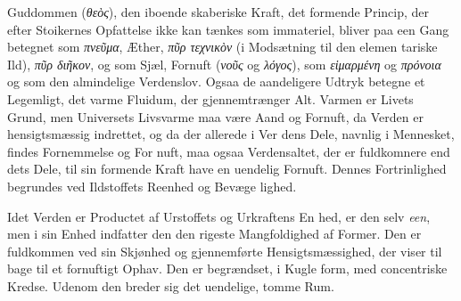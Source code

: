 \documentclass[12pt,a4paper]{book}
\newcommand{\gk}[1]{\textit{#1}}
\begin{document}
Guddommen (\gk{θεὸς}), den iboende skaberiske Kraft, det
formende Princip, der efter Stoikernes Opfattelse ikke kan
tænkes som immateriel, bliver paa een Gang betegnet som
\gk{πνεῦμα}, Æther, \gk{πῦρ τεχνικὸν} (i Modsætning til den elemen\-%
tariske Ild), \gk{πῦρ διῆκον}, og som Sjæl, Fornuft (\gk{νοῦς} og \gk{λόγος}),
som \gk{εἱμαρμένη} og \gk{πρόνοια} og som den almindelige Verdenslov.
Ogsaa de aandeligere Udtryk betegne et Legemligt, det varme
Fluidum, der gjennemtrænger Alt. Varmen er Livets Grund,
men Universets Livsvarme maa være Aand og Fornuft, da
Verden er hensigtsmæssig indrettet, og da der allerede i Ver\-%
dens Dele, navnlig i Mennesket, findes Fornemmelse og For\-%
nuft, maa ogsaa Verdensaltet, der er fuldkomnere end dets
Dele, til sin formende Kraft have en uendelig Fornuft. Dennes
Fortrinlighed begrundes ved Ildstoffets Reenhed og Bevæge\-%
lighed.

Idet Verden er Productet af Urstoffets og Urkraftens En\-%
hed, er den selv \emph{een}, men i sin Enhed indfatter den den
rigeste Mangfoldighed af Former. Den er fuldkommen ved sin
Skjønhed og gjennemførte Hensigtsmæssighed, der viser til\-%
bage til et fornuftigt Ophav. Den er begrændset, i Kugle\-%
form, med concentriske Kredse. Udenom den breder sig det
uendelige, tomme Rum.
\end{document}
